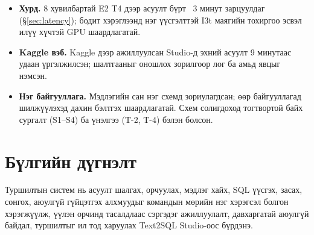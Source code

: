 \begin{itemize}
  \item \textbf{Хурд.} 8 хувилбартай E2 T4 дээр асуулт бүрт ~3 минут зарцуулдаг (§\ref{sec:latency}); бодит хэрэглээнд
        нэг үүсгэлттэй I3t маягийн тохиргоо эсвэл илүү хүчтэй GPU шаардлагатай.
  \item \textbf{Kaggle вэб.} Kaggle дээр ажиллуулсан Studio-д эхний асуулт 9 минутаас удаан үргэлжилсэн; шалтгааныг
        оношлох зорилгоор лог ба амьд явцыг нэмсэн.
  \item \textbf{Нэг байгууллага.} Мэдлэгийн сан нэг схемд зориулагдсан; өөр байгууллагад шилжүүлэхэд дахин бэлтгэх
        шаардлагатай. Схем солигдоход тогтвортой байх сургалт (S1--S4) ба үнэлгээ (T-2, T-4) бэлэн болсон.
\end{itemize}

\section{Бүлгийн дүгнэлт}
\label{sec:ch6-summary}

Туршилтын систем нь асуулт шалгах, орчуулах, мэдлэг хайх, SQL үүсгэх, засах, сонгох, аюулгүй гүйцэтгэх алхмуудыг командын
мөрийн нэг хэрэгсэл болгон хэрэгжүүлж, үүлэн орчинд тасалдлаас сэргэдэг ажиллуулалт, давхаргатай аюулгүй байдал, туршилтыг
ил тод харуулах Text2SQL Studio-оос бүрдэнэ.

